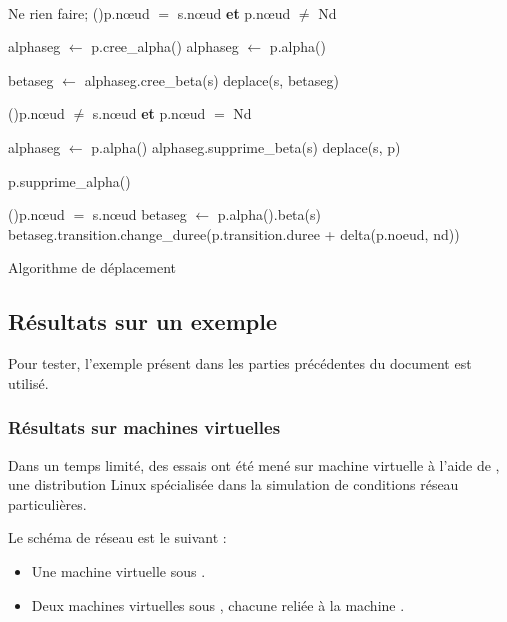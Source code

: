 \begin{algorithm}[H]
	\SetAlgoLined
	
	~ \\
	
	{
		{
			Ne rien faire;	
		}
		\uSinonSi(){p.nœud $=$ s.nœud \textbf{et} p.nœud $\neq$ Nd}
		{
			{
				alphaseg $\longleftarrow$ p.cree\_alpha()\;
			}
			\Sinon
			{
				alphaseg $\longleftarrow$ p.alpha()\;
			}
			
			betaseg $\longleftarrow$ alphaseg.cree\_beta(s)\;
			deplace(s, betaseg)\;
					
		}
		\uSinonSi(){p.nœud $\neq$ s.nœud \textbf{et} p.nœud $=$ Nd}
		{
			alphaseg $\longleftarrow$ p.alpha()\;
			alphaseg.supprime\_beta(s)\;
			deplace(s, p) \;
					
			{
				p.supprime\_alpha()\;
			}		
		}
		\SinonSi(){p.nœud $=$ s.nœud}
		{
			betaseg $\longleftarrow$ p.alpha().beta(s)\;
			betaseg.transition.change\_duree(p.transition.duree + delta(p.noeud, nd))\;
		}	
	}
	
	\caption{Algorithme de déplacement}
	\label{alg.deplacement}
\end{algorithm}

\subsection{Résultats sur un exemple}
Pour tester, l'exemple présent dans les parties précédentes du document est utilisé.

\subsubsection{Résultats sur machines virtuelles}
Dans un temps limité, des essais ont été mené sur machine virtuelle à l'aide de , une distribution Linux spécialisée dans la simulation de conditions réseau particulières.

Le schéma de réseau est le suivant : 
\begin{itemize}
	\item Une machine virtuelle sous .
	\item Deux machines virtuelles sous , chacune reliée à la machine .
\end{itemize}

